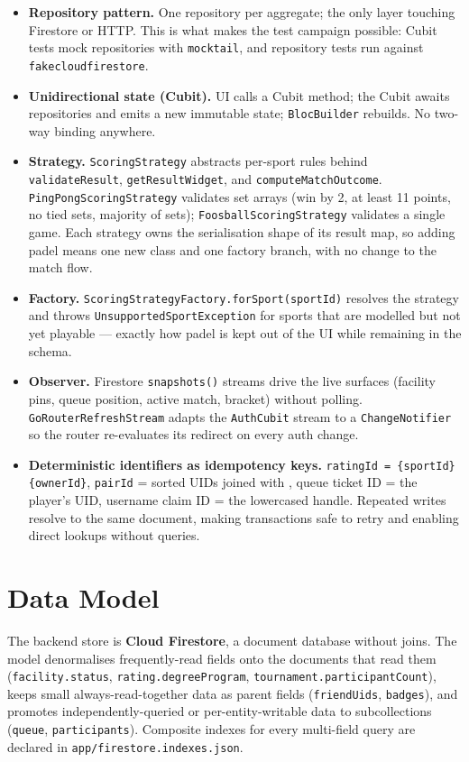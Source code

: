 \documentclass{configurations/polimi3i_thesis}
\renewcommand{\_}{\textunderscore\allowbreak}
\begin{document}
\begin{itemize}
    \item \textbf{Repository pattern.} One repository per aggregate; the only layer touching Firestore or HTTP. This is what makes the test campaign possible: Cubit tests mock repositories with \texttt{mocktail}, and repository tests run against \texttt{fake\_cloud\_firestore}.
    \item \textbf{Unidirectional state (Cubit).} UI calls a Cubit method; the Cubit awaits repositories and emits a new immutable state; \texttt{BlocBuilder} rebuilds. No two-way binding anywhere.
    \item \textbf{Strategy.} \texttt{ScoringStrategy} abstracts per-sport rules behind \texttt{validateResult}, \texttt{getResultWidget}, and \texttt{computeMatchOutcome}. \texttt{PingPongScoringStrategy} validates set arrays (win by 2, at least 11 points, no tied sets, majority of sets); \texttt{FoosballScoringStrategy} validates a single game. Each strategy owns the serialisation shape of its result map, so adding padel means one new class and one factory branch, with no change to the match flow.
    \item \textbf{Factory.} \texttt{ScoringStrategyFactory.forSport(sportId)} resolves the strategy and throws \texttt{UnsupportedSportException} for sports that are modelled but not yet playable — exactly how padel is kept out of the UI while remaining in the schema.
    \item \textbf{Observer.} Firestore \texttt{snapshots()} streams drive the live surfaces (facility pins, queue position, active match, bracket) without polling. \texttt{GoRouterRefreshStream} adapts the \texttt{AuthCubit} stream to a \texttt{ChangeNotifier} so the router re-evaluates its redirect on every auth change.
    \item \textbf{Deterministic identifiers as idempotency keys.} \texttt{ratingId = \{sportId\}\_\{ownerId\}}, \texttt{pairId} = sorted UIDs joined with \texttt{\_}, queue ticket ID = the player's UID, username claim ID = the lowercased handle. Repeated writes resolve to the same document, making transactions safe to retry and enabling direct lookups without queries.
\end{itemize}

\section{Data Model}
\label{sec:data_model}

The backend store is \textbf{Cloud Firestore}, a document database without joins. The model denormalises frequently-read fields onto the documents that read them (\texttt{facility.status}, \texttt{rating.degreeProgram}, \texttt{tournament.participantCount}), keeps small always-read-together data as parent fields (\texttt{friendUids}, \texttt{badges}), and promotes independently-queried or per-entity-writable data to subcollections (\texttt{queue}, \texttt{participants}). Composite indexes for every multi-field query are declared in \texttt{app/firestore.indexes.json}.
\end{document}
